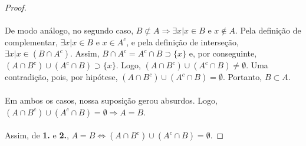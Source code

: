 \documentclass[11pt,a4paper]{report}
\begin{document}
\begin{proof}
    \paragraph{}
    De modo análogo, no segundo caso, $B \not\subset A \Rightarrow \exists x | x \in B$ e $x \not\in A$. Pela definição de complementar, $\exists x | x \in B$ e $x \in A^c$, e pela definição de interseção, $\exists x | x \in (B \cap A^c)$. Assim, $B \cap A^c = A^c \cap B \supset \{x\}$ e, por conseguinte, $(A \cap B^c) \cup (A^c \cap B) \supset \{x\}$. Logo, $(A \cap B^c) \cup (A^c \cap B) \not= \emptyset$. Uma contradição, pois, por hipótese, $(A \cap B^c) \cup (A^c \cap B) = \emptyset$. Portanto, $B \subset A$.

    \paragraph{}
    Em ambos os casos, nossa suposição gerou absurdos. Logo, $(A \cap B^c) \cup (A^c \cap B) = \emptyset \Rightarrow A = B$.

    \paragraph{}
    Assim, de \textbf{1.} e \textbf{2.}, $A = B \Leftrightarrow (A \cap B^c) \cup (A^c \cap B) = \emptyset$.

    \end{proof}
\end{document}
